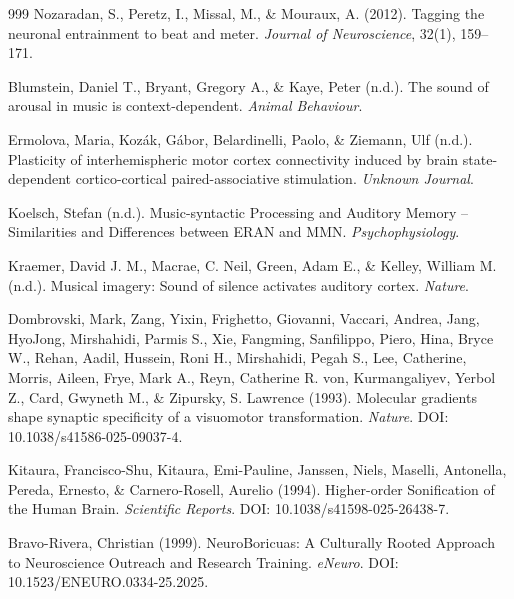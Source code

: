 \documentclass[9pt,onecolumn]{article}
\begin{document}
\begin{thebibliography}{999}
Nozaradan, S., Peretz, I., Missal, M., \& Mouraux, A. (2012). Tagging the neuronal entrainment to beat and meter. \textit{Journal of Neuroscience}, 32(1), 159--171.



Blumstein, Daniel T., Bryant, Gregory A., \& Kaye, Peter (n.d.). The sound of arousal in music is context-dependent. \textit{Animal Behaviour}.

Ermolova, Maria, Kozák, Gábor, Belardinelli, Paolo, \& Ziemann, Ulf (n.d.). Plasticity of interhemispheric motor cortex connectivity induced by brain state-dependent cortico-cortical paired-associative stimulation. \textit{Unknown Journal}.

Koelsch, Stefan (n.d.). Music-syntactic Processing and Auditory Memory – Similarities and Differences between ERAN and MMN. \textit{Psychophysiology}.

Kraemer, David J. M., Macrae, C. Neil, Green, Adam E., \& Kelley, William M. (n.d.). Musical imagery: Sound of silence activates auditory cortex. \textit{Nature}.

Dombrovski, Mark, Zang, Yixin, Frighetto, Giovanni, Vaccari, Andrea, Jang, HyoJong, Mirshahidi, Parmis S., Xie, Fangming, Sanfilippo, Piero, Hina, Bryce W., Rehan, Aadil, Hussein, Roni H., Mirshahidi, Pegah S., Lee, Catherine, Morris, Aileen, Frye, Mark A., Reyn, Catherine R. von, Kurmangaliyev, Yerbol Z., Card, Gwyneth M., \& Zipursky, S. Lawrence (1993). Molecular gradients shape synaptic specificity of a visuomotor transformation. \textit{Nature}. DOI: 10.1038/s41586-025-09037-4.

Kitaura, Francisco-Shu, Kitaura, Emi-Pauline, Janssen, Niels, Maselli, Antonella, Pereda, Ernesto, \& Carnero-Rosell, Aurelio (1994). Higher-order Sonification of the Human Brain. \textit{Scientific Reports}. DOI: 10.1038/s41598-025-26438-7.

Bravo-Rivera, Christian (1999). NeuroBoricuas: A Culturally Rooted Approach to Neuroscience Outreach and Research Training. \textit{eNeuro}. DOI: 10.1523/ENEURO.0334-25.2025.


\end{thebibliography}
\end{document}
